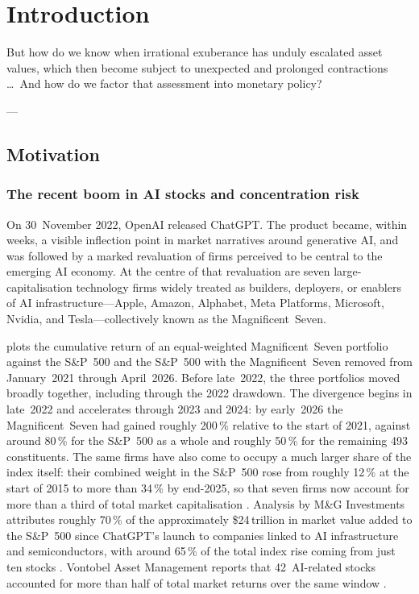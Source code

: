 \chapter{Introduction}
\label{ch:introduction}

\epigraph{%
But how do we know when irrational exuberance has unduly escalated
asset values, which then become subject to unexpected and prolonged
contractions \dots\ And how do we factor that assessment into
monetary policy?%
}{---\,\citet{greenspan1996}}


\section{Motivation}
\label{sec:motivation}

\subsection{The recent boom in AI stocks and concentration risk}
\label{subsec:ai-stock-boom}


On 30~November 2022, OpenAI released ChatGPT. The product
became, within weeks, a visible inflection point in market
narratives around generative AI, and was followed by a marked
revaluation of firms perceived to be central to the emerging
AI economy. At the centre of that revaluation are seven
large-capitalisation technology firms widely treated as
builders, deployers, or enablers of AI infrastructure---Apple,
Amazon, Alphabet, Meta Platforms, Microsoft, Nvidia, and
Tesla---collectively known as the Magnificent~Seven.

 plots the cumulative return of an
equal-weighted Magnificent~Seven portfolio against the
S\&P~500 and the S\&P~500 with the Magnificent~Seven removed
from January~2021 through April~2026. Before late~2022, the
three portfolios moved broadly together, including through the
2022 drawdown. The divergence begins in late~2022 and
accelerates through 2023 and 2024: by early~2026 the
Magnificent~Seven had gained roughly 200\,\% relative to the
start of 2021, against around 80\,\% for the S\&P~500 as a
whole and roughly 50\,\% for the remaining 493 constituents.
The same firms have also come to occupy a much larger share of
the index itself: their combined weight in the S\&P~500 rose
from roughly 12\,\% at the start of 2015 to more than 34\,\%
by end-2025, so that seven firms now account for more than a
third of total market capitalisation \citep{motleyFoolNasdaq2026}.
Analysis by M\&G Investments attributes roughly 70\,\% of the
approximately \$24\,trillion in market value added to the
S\&P~500 since ChatGPT's launch to companies linked to AI
infrastructure and semiconductors, with around 65\,\% of the
total index rise coming from just ten stocks
\citep{vine2025}. Vontobel Asset Management reports that
42~AI-related stocks accounted for more than half of total
market returns over the same window \citep{souccar2026}.

